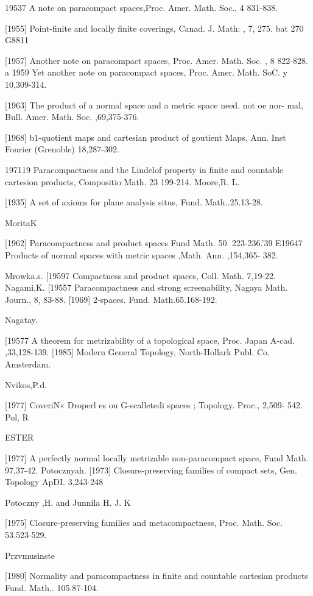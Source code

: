 \documentclass[main.tex]{subfiles}
\begin{document}
{19537
	A note on paracompact spaces,Proc. Amer. Math. Soc., 4 831-838.
	
[1955]
	Point-finite and locally finite coverings, Canad. J. Math: , 7, 275.
	bat 270
	G8811

[1957]
	Another note on paracompact spaces, Proc. Amer. Math. Soc. , 8
	822-828.
	a 1959 Yet another note on paracompact spaces, Proc. Amer. Math.
	SoC. y
	10,309-314.

[1963]
	The product of a normal space and a metric space
	need. not oe nor-
	mal, Bull. Amer. Math. Soc. ,69,375-376.

[1968]
	b1-quotient maps and cartesian product of goutient Maps, Ann. Inst
	Fourier (Grenoble) 18,287-302.

	197119 Paracompactness and the Lindelof property in finite and countable
	cartesion products, Compositio Math. 23 199-214.
	Moore,R. L.
	
[1935]
	A set of axioms for plane analysis situs, Fund. Math..25.13-28.
	
\noindent MoritaK

	[1962]
	Paracompactness and product spaces Fund Math. 50. 223-236.'39
	E19647 Products of normal spaces with metric spaces ,Math. Ann. ,154,365-
	382.

\noindent Mrowka.s.
	[19597 Compactness and product spaces, Coll. Math. 7,19-22.
	Nagami,K.
	[19557 Paracompactness and strong screenability, Nagaya Math. Journ., 8,
	83-88.
	[1969]
	2-spaces. Fund. Math.65.168-192.

\noindent Nagatay.

	[19577 A theorem for metrizability of a topological space, Proc. Japan A-cad. ,33,128-139.
	[1985]
	Modern General Topology, North-Hollark Publ. Co.
	~ Amsterdam.

\noindent Nvikos,P.d.

	[1977]
	CoveriN« Droperl
	es on G-scalletedi spaces ; Topology. Proc., 2,509-
	542.
	Pol, R

\noindent ESTER

	[1977] A perfectly normal locally metrizable non-paracompact space, Fund
	Math.
	97,37-42.
	Potocznyah.
	[1973]
	Closure-preserving families of compact sets, Gen. Topology ApDI.
	3,243-248

\noindent Potoczny ,H. and Junnila H. J. K

	[1975]%
	Closure-preserving
	families and metacompactness, Proc.
	Math. Soc.
	53.523-529.

\noindent Przvmusinste

	[1980]
	Normality and paracompactness in finite and countable cartesian
	products Fund. Math.. 105.87-104.

}
\end{document}
